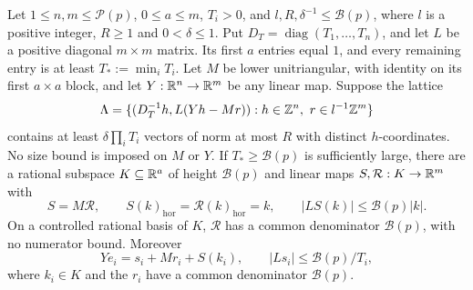 \begin{lemma}\label{prelim:lattice}
Let $1\leq n,m\leq\mathcal P(p)$, $0\leq a\leq m$,
$T_i>0$, and $l,R,\delta^{-1}\leq\mathcal B(p)$,
where $l$ is a positive integer, $R\geq1$ and $0<\delta\leq1$.
Put $D_T=\operatorname{diag}(T_1,\ldots,T_n)$, and let $L$ be a
positive diagonal $m\times m$ matrix.  Its first $a$ entries equal
$1$, and every remaining entry is at least $T_*:=\min_iT_i$.
Let $M$ be lower unitriangular, with identity on its first
$a\times a$ block, and let $Y:\mathbb R^n\to\mathbb R^m$ be any linear map.
Suppose the lattice
\begin{equation}\label{prelim:lattice-definition}
 \Lambda=\{(D_T^{-1}h,L(Yh-Mr)):
             h\in\mathbb Z^n,\ r\in l^{-1}\mathbb Z^m\}
\end{equation}
contains at least $\delta\prod_iT_i$ vectors of norm at most $R$
with distinct $h$-coordinates.  No size bound is imposed on $M$ or
$Y$.  If $T_*\geq\mathcal B(p)$ is sufficiently large, there are
a rational subspace $K\subseteq\mathbb R^a$ of height $\mathcal B(p)$ and
linear maps $S,\mathcal R:K\to\mathbb R^m$ with
\begin{equation}\label{prelim:lattice-lifts}
 S=M\mathcal R,\qquad
 S(k)_{\mathrm{hor}}=\mathcal R(k)_{\mathrm{hor}}=k,
 \qquad |LS(k)|\leq\mathcal B(p)|k|.
\end{equation}
On a controlled rational basis of $K$, $\mathcal R$ has a common
denominator $\mathcal B(p)$, with no numerator bound.  Moreover
\begin{equation}\label{prelim:lattice-derivatives}
 Ye_i=s_i+Mr_i+S(k_i),\qquad
 |Ls_i|\leq\mathcal B(p)/T_i,
\end{equation}
where $k_i\in K$ and the $r_i$ have a common denominator
$\mathcal B(p)$.
\end{lemma}

